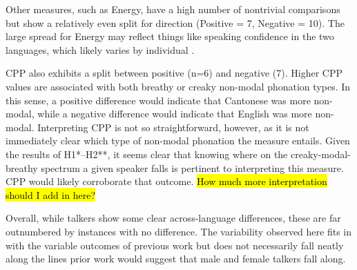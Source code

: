 Other measures, such as Energy, have a high number of nontrivial comparisons but show a relatively even split for direction (Positive = 7, Negative = 10). The large spread for Energy may reflect things like speaking confidence in the two languages, which likely varies by individual \citep{jarvinen_2013_speaking}.

CPP also exhibits a split between positive (n=6) and negative (7). Higher CPP values are associated with both breathy or creaky non-modal phonation types. In this sense, a positive difference would indicate that Cantonese was more non-modal, while a negative difference would indicate that English was more non-modal. Interpreting CPP is not so straightforward, however, as it is not immediately clear which type of non-modal phonation the measure entails. Given the results of H1*--H2**, it seems clear that knowing where on the creaky-modal-breathy spectrum a given speaker falls is pertinent to interpreting this measure. CPP would likely corroborate that outcome. \hl{How much more interpretation should I add in here?}

Overall, while talkers show some clear across-language differences, these are far outnumbered by instances with no difference. The variability observed here fits in with the variable outcomes of previous work but does not necessarily fall neatly along the lines prior work would suggest that male and female talkers fall along. 

